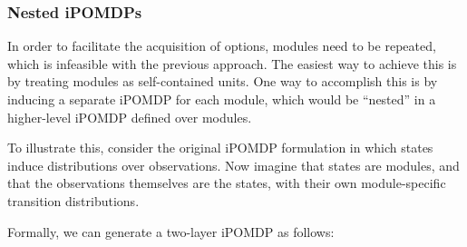 \documentclass[11pt]{article}
\begin{document}
\subsubsection{Nested iPOMDPs}

In order to facilitate the acquisition of options, modules need to be repeated, which is infeasible with the previous approach. The easiest way to achieve this is by treating modules as self-contained units. One way to accomplish this is by inducing a separate iPOMDP for each module, which would be ``nested'' in a higher-level iPOMDP defined over modules.

To illustrate this, consider the original iPOMDP formulation in which states induce distributions over observations. Now imagine that states are modules, and that the observations themselves are the states, with their own module-specific transition distributions.

Formally, we can generate a two-layer iPOMDP as follows:
\end{document}
